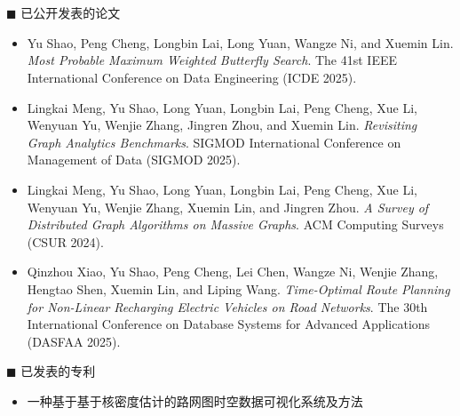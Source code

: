 \chapter*{}
\vskip 5mm

  {\heiti $\blacksquare$ 已公开发表的论文}\vskip 5mm

\begin{itemize}
  \item 
  Yu Shao, Peng Cheng, Longbin Lai, Long Yuan, Wangze Ni, and Xuemin Lin. \textit{Most Probable Maximum Weighted Butterfly Search}. The 41st IEEE International Conference on Data Engineering (ICDE 2025).

  \item 
  Lingkai Meng, Yu Shao, Long Yuan, Longbin Lai, Peng Cheng, Xue Li, Wenyuan Yu, Wenjie Zhang, Jingren Zhou, and Xuemin Lin. \textit{Revisiting Graph Analytics Benchmarks}. SIGMOD International Conference on Management of Data (SIGMOD 2025).

  \item 
  Lingkai Meng, Yu Shao, Long Yuan, Longbin Lai, Peng Cheng, Xue Li, Wenyuan Yu, Wenjie Zhang, Xuemin Lin, and Jingren Zhou. \textit{A Survey of Distributed Graph Algorithms on Massive Graphs}. ACM Computing Surveys (CSUR 2024).

  \item 
  Qinzhou Xiao, Yu Shao, Peng Cheng, Lei Chen, Wangze Ni, Wenjie Zhang, Hengtao Shen, Xuemin Lin, and Liping Wang. \textit{Time-Optimal Route Planning for Non-Linear Recharging Electric Vehicles on Road Networks}. The 30th International Conference on Database Systems for Advanced Applications (DASFAA 2025).
\end{itemize}

\bigskip\bigskip

{\heiti $\blacksquare$ 已发表的专利}\vskip 5mm

\begin{itemize}
  \item 一种基于基于核密度估计的路网图时空数据可视化系统及方法
\end{itemize}
